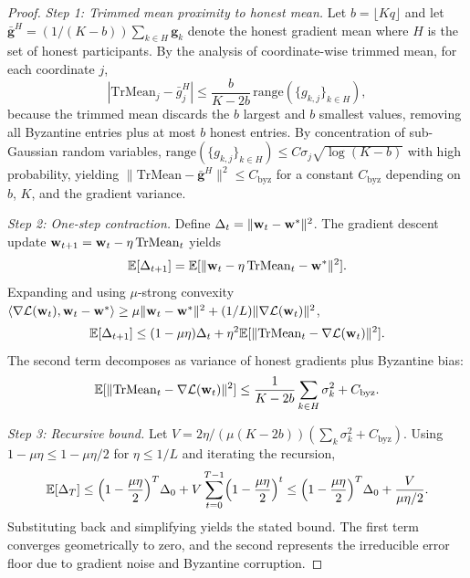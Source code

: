 \begin{proof}
\textit{Step 1: Trimmed mean proximity to honest mean.} Let $b=\lfloor Kq\rfloor$ and let $\bar{\mathbf{g}}^H = (1/(K-b))\sum_{k\in H}\mathbf{g}_k$ denote the honest gradient mean where $H$ is the set of honest participants. By the analysis of coordinate-wise trimmed mean, for each coordinate $j$,
\begin{equation}
|\mathrm{TrMean}_j - \bar{g}_j^H|
\le \frac{b}{K-2b}\,\mathrm{range}(\{g_{k,j}\}_{k\in H}),
\end{equation}
because the trimmed mean discards the $b$ largest and $b$ smallest values, removing all Byzantine entries plus at most $b$ honest entries. By concentration of sub-Gaussian random variables, $\mathrm{range}(\{g_{k,j}\}_{k\in H})\le C\sigma_j\sqrt{\log(K-b)}$ with high probability, yielding $\|\mathrm{TrMean}-\bar{\mathbf{g}}^H\|^2\le C_{\mathrm{byz}}$ for a constant $C_{\mathrm{byz}}$ depending on $b$, $K$, and the gradient variance.

\textit{Step 2: One-step contraction.} Define $\Delta_t = \|\mathbf{w}_t-\mathbf{w}^*\|^2$. The gradient descent update $\mathbf{w}_{t+1}=\mathbf{w}_t-\eta\,\mathrm{TrMean}_t$ yields
\begin{equation}
\mathbb{E}[\Delta_{t+1}]
= \mathbb{E}[\|\mathbf{w}_t - \eta\,\mathrm{TrMean}_t - \mathbf{w}^*\|^2].
\end{equation}
Expanding and using $\mu$-strong convexity $\langle\nabla\mathcal{L}(\mathbf{w}_t),\mathbf{w}_t-\mathbf{w}^*\rangle\ge\mu\|\mathbf{w}_t-\mathbf{w}^*\|^2 + (1/L)\|\nabla\mathcal{L}(\mathbf{w}_t)\|^2$,
\begin{equation}
\mathbb{E}[\Delta_{t+1}]
\le (1-\mu\eta)\Delta_t + \eta^2\mathbb{E}[\|\mathrm{TrMean}_t - \nabla\mathcal{L}(\mathbf{w}_t)\|^2].
\end{equation}
The second term decomposes as variance of honest gradients plus Byzantine bias:
\begin{equation}
\mathbb{E}[\|\mathrm{TrMean}_t - \nabla\mathcal{L}(\mathbf{w}_t)\|^2]
\le \frac{1}{K-2b}\sum_{k\in H}\sigma_k^2 + C_{\mathrm{byz}}.
\end{equation}

\textit{Step 3: Recursive bound.} Let $V = 2\eta/(\mu(K{-}2b))(\sum_k\sigma_k^2 + C_{\mathrm{byz}})$. Using $1-\mu\eta\le 1-\mu\eta/2$ for $\eta\le 1/L$ and iterating the recursion,
\begin{equation}
\mathbb{E}[\Delta_T]
\le \Bigl(1-\frac{\mu\eta}{2}\Bigr)^T \Delta_0 + V\sum_{t=0}^{T-1}\Bigl(1-\frac{\mu\eta}{2}\Bigr)^t
\le \Bigl(1-\frac{\mu\eta}{2}\Bigr)^T \Delta_0 + \frac{V}{\mu\eta/2}.
\end{equation}
Substituting back and simplifying yields the stated bound. The first term converges geometrically to zero, and the second represents the irreducible error floor due to gradient noise and Byzantine corruption.
\end{proof}


